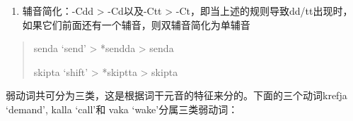 \begin{enumerate}
  \def\labelenumi{\arabic{enumi})}
  \setcounter{enumi}{5}
  \item
        辅音简化：-Cdd \textgreater{} -Cd以及-Ctt \textgreater{}
        -Ct，即当上述的规则导致dd/tt出现时，如果它们前面还有一个辅音，则双辅音简化为单辅音
\end{enumerate}

\begin{quote}
  senda `send‌' \textgreater{} *sendda \textgreater{} senda

  skipta `shift‌' \textgreater{} *skiptta \textgreater{} skipta
\end{quote}

弱动词共可分为三类，这是根据词干元音的特征来分的。下面的三个动词krefja
`demand‌', kalla `call‌'和 vaka `wake‌'分属三类弱动词：

